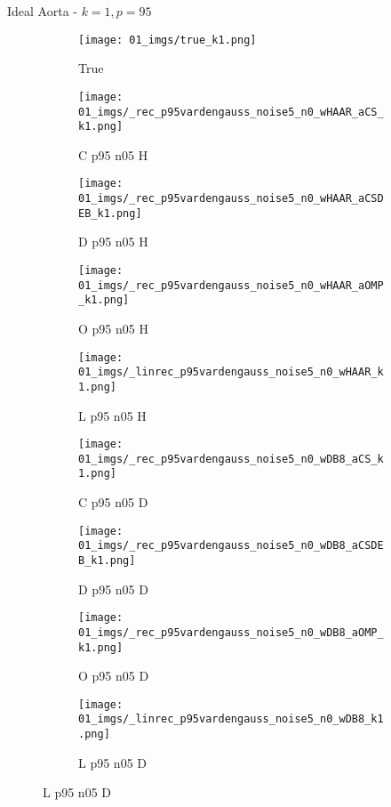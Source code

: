 \begin{frame}{Ideal Aorta - $k=1,p=95$}{}
\begin{figure}
\begin{subfigure}{0.1\textwidth}
\texttt{[image: 01\_imgs/true\_k1.png]}
\caption*{\Tiny True}
\end{subfigure}
\begin{subfigure}{0.1\textwidth}
\texttt{[image: 01\_imgs/\_rec\_p95vardengauss\_noise5\_n0\_wHAAR\_aCS\_k1.png]}
\caption*{\Tiny C p95 n05 H}
\end{subfigure}
\begin{subfigure}{0.1\textwidth}
\texttt{[image: 01\_imgs/\_rec\_p95vardengauss\_noise5\_n0\_wHAAR\_aCSDEB\_k1.png]}
\caption*{\Tiny D p95 n05 H}
\end{subfigure}
\begin{subfigure}{0.1\textwidth}
\texttt{[image: 01\_imgs/\_rec\_p95vardengauss\_noise5\_n0\_wHAAR\_aOMP\_k1.png]}
\caption*{\Tiny O p95 n05 H}
\end{subfigure}
\begin{subfigure}{0.1\textwidth}
\texttt{[image: 01\_imgs/\_linrec\_p95vardengauss\_noise5\_n0\_wHAAR\_k1.png]}
\caption*{\Tiny L p95 n05 H}
\end{subfigure}
\begin{subfigure}{0.1\textwidth}
\texttt{[image: 01\_imgs/\_rec\_p95vardengauss\_noise5\_n0\_wDB8\_aCS\_k1.png]}
\caption*{\Tiny C p95 n05 D}
\end{subfigure}
\begin{subfigure}{0.1\textwidth}
\texttt{[image: 01\_imgs/\_rec\_p95vardengauss\_noise5\_n0\_wDB8\_aCSDEB\_k1.png]}
\caption*{\Tiny D p95 n05 D}
\end{subfigure}
\begin{subfigure}{0.1\textwidth}
\texttt{[image: 01\_imgs/\_rec\_p95vardengauss\_noise5\_n0\_wDB8\_aOMP\_k1.png]}
\caption*{\Tiny O p95 n05 D}
\end{subfigure}
\begin{subfigure}{0.1\textwidth}
\texttt{[image: 01\_imgs/\_linrec\_p95vardengauss\_noise5\_n0\_wDB8\_k1.png]}
\caption*{\Tiny L p95 n05 D}
\end{subfigure}

\vspace{5pt}


\end{figure}
\end{frame}
